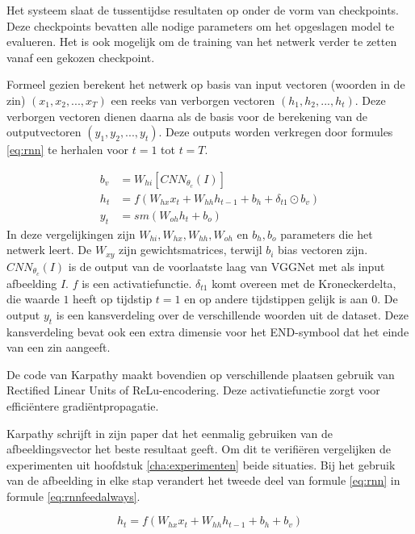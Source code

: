 Het systeem slaat de tussentijdse resultaten op onder de vorm van checkpoints. Deze checkpoints bevatten alle nodige parameters om het opgeslagen model te evalueren. Het is ook mogelijk om de training van het netwerk verder te zetten vanaf een gekozen checkpoint.

Formeel gezien berekent het netwerk op basis van input vectoren (woorden in de zin) $(x_1,x_2,...,x_T)$ een reeks van verborgen vectoren $(h_1,h_2,...,h_t)$. Deze verborgen vectoren dienen daarna als de basis voor de berekening van de outputvectoren $(y_1,y_2,...,y_t)$. Deze outputs worden verkregen door formules \eqref{eq:rnn} te herhalen voor $t = 1$ tot $t=T$.

\begin{equation}
\begin{aligned}
     b_v &= W_{hi} [CNN_{\theta_c}(I)] \\
     h_t &= f(W_{hx} x_{t} + W_{hh} h_{t-1} + b_h + \delta_{t1} \odot b_v) \\
     y_t &= sm( W_{oh} h_t + b_o)
\end{aligned}
\label{eq:rnn}
\end{equation}
In deze vergelijkingen zijn $W_{hi}, W_{hx}, W_{hh}, W_{oh}$ en $b_h, b_o$ parameters die het netwerk leert. De $W_{xy}$ zijn gewichtsmatrices, terwijl $b_i$ bias vectoren zijn. $CNN_{\theta_c}(I)$ is de output van de voorlaatste laag van VGGNet met als input afbeelding $I$. $f$ is een activatiefunctie. $\delta_{t1}$ komt overeen met de Kroneckerdelta, die waarde $1$ heeft op tijdstip $t=1$ en op andere tijdstippen gelijk is aan $0$. De output $y_t$ is een kansverdeling over de verschillende woorden uit de dataset. Deze kansverdeling bevat ook een extra dimensie voor het END-symbool dat het einde van een zin aangeeft. 

De code van Karpathy maakt bovendien op verschillende plaatsen gebruik van Rectified Linear Units of ReLu-encodering. Deze activatiefunctie zorgt voor effici\"entere gradi\"entpropagatie.

Karpathy schrijft in zijn paper dat het eenmalig gebruiken van de afbeeldingsvector het beste resultaat geeft. Om dit te verifi\"eren vergelijken de experimenten uit hoofdstuk \ref{cha:experimenten} beide situaties. Bij het gebruik van de afbeelding in elke stap verandert het tweede deel van formule \eqref{eq:rnn} in formule \eqref{eq:rnnfeedalways}.

\begin{equation}
     h_t = f(W_{hx} x_{t} + W_{hh} h_{t-1} + b_h + b_v)
\label{eq:rnnfeedalways}
\end{equation}

